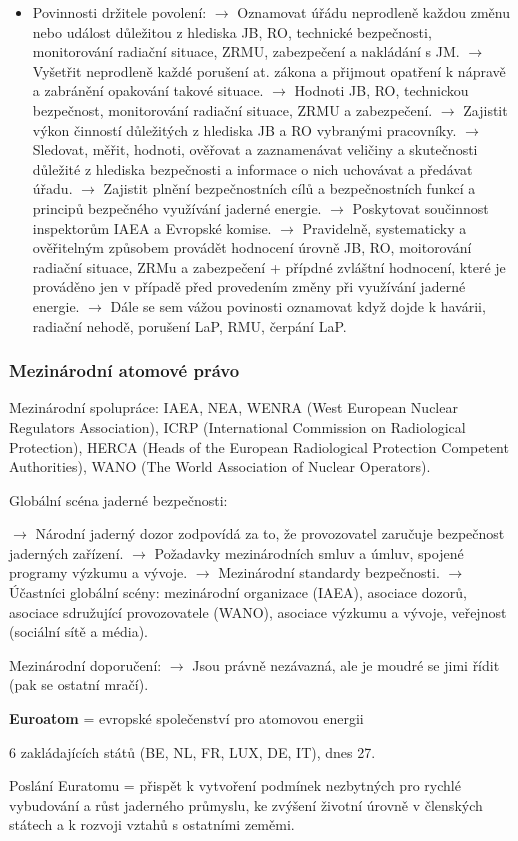 \begin{itemize}
    \item Povinnosti držitele povolení:
    $\rightarrow$ Oznamovat úřádu neprodleně každou změnu nebo událost důležitou z hlediska JB, RO, technické bezpečnosti, monitorování radiační situace, ZRMU, zabezpečení a nakládání s JM.
    $\rightarrow$ Vyšetřit neprodleně každé porušení at. zákona a přijmout opatření k nápravě a zabránění opakování takové situace.
    $\rightarrow$ Hodnoti JB, RO, technickou bezpečnost, monitorování radiační situace, ZRMU a zabezpečení.
    $\rightarrow$ Zajistit výkon činností důležitých z hlediska JB a RO vybranými pracovníky.
    $\rightarrow$ Sledovat, měřit, hodnoti, ověřovat a zaznamenávat veličiny a skutečnosti důležité z hlediska bezpečnosti a informace o nich uchovávat a předávat úřadu.
    $\rightarrow$ Zajistit plnění bezpečnostních cílů a bezpečnostních funkcí a principů bezpečného využívání jaderné energie.
    $\rightarrow$ Poskytovat součinnost inspektorům IAEA a Evropské komise.
    $\rightarrow$ Pravidelně, systematicky a ověřitelným způsobem provádět hodnocení úrovně JB, RO, moitorování radiační situace, ZRMu a zabezpečení + přípdné zvláštní hodnocení, které je prováděno jen v případě před provedením změny při využívání jaderné energie.
    $\rightarrow$ Dále se sem vážou povinosti oznamovat když dojde k havárii, radiační nehodě, porušení LaP, RMU, čerpání LaP.
\end{itemize}



\subsubsection{Mezinárodní atomové právo}

Mezinárodní spolupráce: IAEA, NEA, WENRA (West European Nuclear Regulators Association), ICRP (International Commission on Radiological Protection), HERCA (Heads of the European Radiological Protection Competent Authorities), WANO (The World Association of Nuclear Operators).

Globální scéna jaderné bezpečnosti:

$\rightarrow$ Národní jaderný dozor zodpovídá za to, že provozovatel zaručuje bezpečnost jaderných zařízení.
$\rightarrow$ Požadavky mezinárodních smluv a úmluv, spojené programy výzkumu a vývoje.
$\rightarrow$ Mezinárodní standardy bezpečnosti.
$\rightarrow$ Účastníci globální scény: mezinárodní organizace (IAEA), asociace dozorů, asociace sdružující provozovatele (WANO), asociace výzkumu a vývoje, veřejnost (sociální sítě a média).

Mezinárodní doporučení:
$\rightarrow$ Jsou právně nezávazná, ale je moudré se jimi řídit (pak se ostatní mračí).

\textbf{Euroatom} = evropské společenství pro atomovou energii

6 zakládajících států (BE, NL, FR, LUX, DE, IT), dnes 27. 

Poslání Euratomu = přispět k vytvoření podmínek nezbytných pro rychlé vybudování a růst jaderného průmyslu, ke zvýšení životní úrovně v členských státech a k rozvoji vztahů s ostatními zeměmi.
